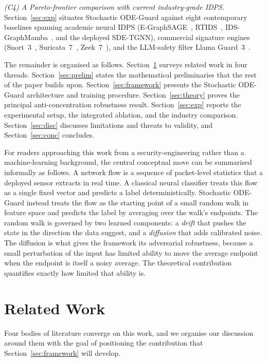 \documentclass[journal,10pt]{IEEEtran}
\theoremstyle{definition}
\theoremstyle{remark}
\begin{document}
\emph{(C4) A Pareto-frontier comparison with current industry-grade
IDPS.} Section~\ref{sec:exp} situates Stochastic ODE-Guard against
eight contemporary baselines spanning academic neural IDPS
(E-GraphSAGE~\cite{lo2022egraphsage}, RTIDS~\cite{wu2022rtids},
IDS-GraphMamba~\cite{mosaiyebzadeh2025graphmamba}, and the deployed
SDE-TGNN), commercial signature engines
(Snort~3~\cite{snort3}, Suricata~7~\cite{suricata7}, Zeek~7~\cite{zeek7}),
and the LLM-safety filter Llama Guard~3~\cite{llamaguard3}.

The remainder is organised as follows. Section~\ref{sec:related}
surveys related work in four threads. Section~\ref{sec:prelim} states
the mathematical preliminaries that the rest of the paper builds upon.
Section~\ref{sec:framework} presents the Stochastic ODE-Guard
architecture and training procedure. Section~\ref{sec:theory} proves
the principal anti-concentration robustness result.
Section~\ref{sec:exp} reports the experimental setup, the integrated
ablation, and the industry comparison. Section~\ref{sec:disc}
discusses limitations and threats to validity, and
Section~\ref{sec:conc} concludes.

For readers approaching this work from a security-engineering rather
than a machine-learning background, the central conceptual move can be
summarised informally as follows. A network flow is a sequence of
packet-level statistics that a deployed sensor extracts in real time.
A classical neural classifier treats this flow as a single fixed
vector and predicts a label deterministically. Stochastic ODE-Guard
instead treats the flow as the starting point of a small random walk
in feature space and predicts the label by averaging over the walk's
endpoints. The random walk is governed by two learned components: a
\emph{drift} that pushes the state in the direction the data suggest,
and a \emph{diffusion} that adds calibrated noise. The diffusion is
what gives the framework its adversarial robustness, because a
small perturbation of the input has limited ability to move the
average endpoint when the endpoint is itself a noisy average.
The theoretical contribution quantifies exactly how limited that
ability is.

\section{Related Work}\label{sec:related}
Four bodies of literature converge on this work, and we organise our
discussion around them with the goal of positioning the contribution
that Section~\ref{sec:framework} will develop.
\end{document}
